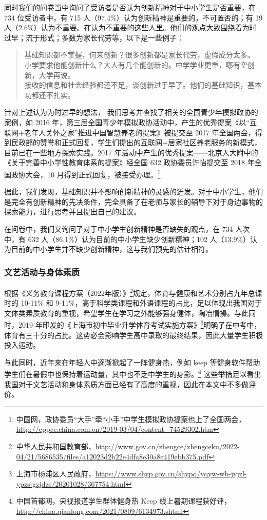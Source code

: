 \documentclass[12pt,UTF8]{ctexart}
\begin{document}
\par {
	同时我们的问卷当中询问了受访者是否认为创新精神对于中小学生是否重要，在 734 位受访者中，有 715 人（97.4\%）认为创新精神是重要的，不可置否的；有
	19 人（2.6\%）认为不重要。在认为不重要的这些人里。他们的观点大致围绕着为时过早；流于形式；多数为家长代劳等，以下是一些例子：
	\begin{quote}
		\kaishu 
		基础知识都不掌握，何来创新？很多创新都是家长代劳，虚假成分太多。\\
		小学要求他能创新什么？大人有几个能创新的。中学学业更重，哪有空创新，大学再说。\\
		接收的信息和社会经验都还不足，谈创新过于早了。他们的基础知识，基本功都还不扎实。
	\end{quote}
}
\par {
	针对上述认为为时过早的想法， 我们思考并查找了相关的全国青少年模拟政协的案例，如 2016
	年，第三届全国青少年模拟政协活动中，产生的优秀提案《以“互联网+老年人关怀之家”推进中国智慧养老的提案》被提交至 2017
	年全国两会，得到民政部的赞誉和正式回复，学生们提出的互联网+居家社区养老服务的新模式，目前已在一些地方探索实践。2017
	年活动中产生的优秀提案——北京人大附中的《关于完善中小学性教育体系的提案》经全国 632 政协委员许怡提交至 2018 年全国政协大会，10
	月得到正式回复，被接受办理。\footnote{中国网，政协委员“大手”牵“小手”中学生模拟政协提案也上了全国两会，\url{http://cppcc.china.com.cn/2019-03/04/content_74529302.htm}}
}
\par {
	
	据此，我们发现，基础知识并不影响创新精神的灵感的迸发。对于中小学生，他们是完全有创新精神的先决条件，完全具备了在老师与家长的辅导下对于身边事物的探索能力，进行思考并且提出自己的建议。
}
\par {
	在问卷中，我们又询问了对于中小学生创新精神是否缺失的观点，在 734 人次中，有 632 人（86.1\%）认为目前的中小学生缺少创新精神；102
	人（13.9\%）认为目前的中小学生并不缺少创新精神，这与我们预先的估计相符。
}

\subsubsection {文艺活动与身体素质}
\par {
	
	根据《义务教育课程方案（2022年版）》\footnote{中华人民共和国教育部，\url{http://www.gov.cn/zhengce/zhengceku/2022-04/21/5686535/files/a12023d2b22e4dfa8e30a8e419ebb375.pdf}}规定，体育与健康和艺术分别占九年总课时的
	10-11\% 和
	9-11\%，高于科学类课程和外语课程的占比，足以体现出我国对于文体类素质教育的重视，希望学生在学习之外能够强身健体，陶冶情操。与此同时，2019
	年印发的《上海市初中毕业升学体育考试实施方案》\footnote{上海市杨浦区人民政府，\url{https://www.shyp.gov.cn/shypq/yqyw-wb-jyjzl-ypzs-gzjdzs/20201028/367754.html}}明确了在中考中，体育有三十分的占比。这势必会影响学生高中录取的最终结果，因此大量学生积极投入运动。
}
\par {
	与此同时，近年来在年轻人中逐渐掀起了一阵健身热，例如 keep
	等健身软件帮助学生们在暑假中也保持着运动量，其中也不乏中学生的身影。\footnote{中国首都网，央视报道学生群体健身热 Keep
		线上暑期课程获好评，\url{http://china.qianlong.com/2021/0809/6134973.shtml}}
	这些举措足以看出我国对于文艺活动和身体素质方面已经有了高度的重视，因此在本文中不多做评价。
}
\end{document}
